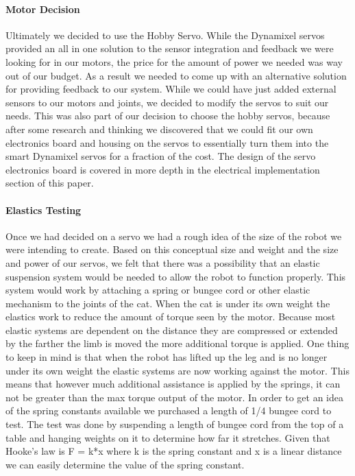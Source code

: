             \paragraph{Motor Decision}
                Ultimately we decided to use the Hobby Servo. While the Dynamixel servos provided an all in one solution to the sensor integration and feedback we were looking for in our motors, the price for the amount of power we needed was way out of our budget. As a result we needed to come up with an alternative solution for providing feedback to our system. While we could have just added external sensors to our motors and joints, we decided to modify the servos to suit our needs. This was also part of our decision to choose the hobby servos, because after some research and thinking we discovered that we could fit our own electronics board and housing on the servos to essentially turn them into the smart Dynamixel servos for a fraction of the cost. The design of the servo electronics board is covered in more depth in the electrical implementation section of this paper.
                
            \paragraph{Elastics Testing}

                Once we had decided on a servo we had a rough idea of the size of the robot we were intending to create. Based on this conceptual size and weight and the size and power of our servos,  we felt that there was a possibility that an elastic suspension system would be needed to allow the robot to function properly. This system would work by attaching a spring or bungee cord or other elastic mechanism to the joints of the cat. When the cat is under its own weight the elastics work to reduce the amount of torque seen by the motor. Because most elastic systems are dependent on the distance they are compressed or extended by the farther the limb is moved the more additional torque is applied. One thing to keep in mind is that when the robot has lifted up the leg and is no longer under its own weight the elastic systems are now working against the motor. This means that however much additional assistance is applied by the springs, it can not be greater than the max torque output of the motor.  In order to get an idea of the spring constants available we purchased a length of 1/4 bungee cord to test. The test was done by suspending a length of bungee cord from the top of a table and hanging weights on it to determine how far it stretches.  Given that Hooke's law is F = k*x where k is the spring constant and x is a linear distance we can easily determine the value of the spring constant. 
	
